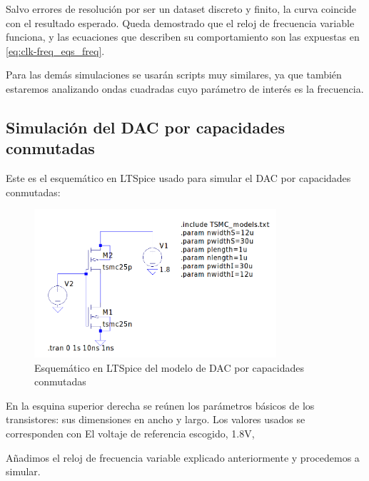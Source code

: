 \documentclass[12pt]{report} %
\begin{document}
	Salvo errores de resolución por ser un dataset discreto y finito, la curva coincide con el resultado esperado. Queda demostrado que el reloj de frecuencia variable funciona, y las ecuaciones que describen su comportamiento son las expuestas en \ref{eq:clk-freq_eqs_freq}.
	
	Para las demás simulaciones se usarán scripts muy similares, ya que también estaremos analizando ondas cuadradas cuyo parámetro de interés es la frecuencia.	




	\subsection{Simulación del DAC por capacidades conmutadas}
	
	Este es el esquemático en LTSpice usado para simular el DAC por capacidades conmutadas:
	
	\begin{figure}[H]
		\includegraphics[width=0.8\textwidth]{ltspice-sw-cap-empty.png}
		\caption[Esquemático en LTSpice del modelo de DAC por capacidades conmutadas]{Esquemático en LTSpice del modelo de DAC por capacidades conmutadas}
		\label{fig:ltspice-sw-cap-empty.png}
	\end{figure}
	
	En la esquina superior derecha se reúnen los parámetros básicos de los transistores: sus dimensiones en ancho y largo. Los valores usados se corresponden con %
	El voltaje de referencia escogido, 1.8V, %
	
	Añadimos el reloj de frecuencia variable explicado anteriormente y procedemos a simular.
\end{document}
